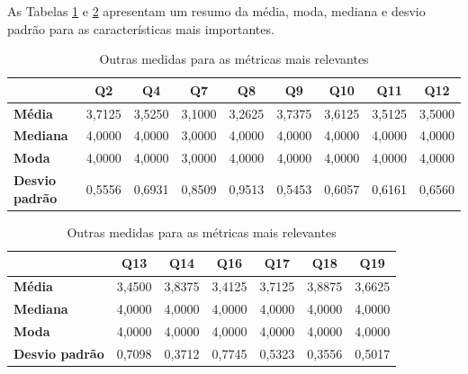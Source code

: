 As Tabelas \ref{outrasmedidas1} e \ref{outras medidas 2} apresentam um resumo da média, moda, mediana e desvio padrão para as características mais importantes.

\begin{table}[!htbp]
  \centering
  \caption{Outras medidas para as métricas mais relevantes}
    \begin{tabular}{llrrrrrrrr}
    \toprule
    \multicolumn{2}{l}{} & \multicolumn{1}{c}{\textbf{Q2}} & \multicolumn{1}{c}{\textbf{Q4}} & \multicolumn{1}{c}{\textbf{Q7}} & \multicolumn{1}{c}{\textbf{Q8}} & \multicolumn{1}{c}{\textbf{Q9}} & \multicolumn{1}{c}{\textbf{Q10}} & \multicolumn{1}{c}{\textbf{Q11}} & \multicolumn{1}{c}{\textbf{Q12}} \\
    \midrule
    \multicolumn{2}{l}{\textbf{Média}} & 3,7125 & 3,5250 & 3,1000 & 3,2625 & 3,7375 & 3,6125 & 3,5125 & 3,5000 \\
    \multicolumn{2}{l}{\textbf{Mediana}} & 4,0000 & 4,0000 & 3,0000 & 4,0000 & 4,0000 & 4,0000 & 4,0000 & 4,0000 \\
    \multicolumn{2}{l}{\textbf{Moda}} & 4,0000 & 4,0000 & 3,0000 & 4,0000 & 4,0000 & 4,0000 & 4,0000 & 4,0000 \\
    \multicolumn{2}{l}{\textbf{Desvio padrão}} & 0,5556 & 0,6931 & 0,8509 & 0,9513 & 0,5453 & 0,6057 & 0,6161 & 0,6560 \\
    \bottomrule
    \end{tabular}%
  \label{outrasmedidas1}%
\end{table}%

\begin{table}[!ht]
  \centering
  \caption{Outras medidas para as métricas mais relevantes}
    \begin{tabular}{llrrrrrr}
    \toprule
    \multicolumn{2}{l}{} & \multicolumn{1}{c}{\textbf{Q13}} & \multicolumn{1}{c}{\textbf{Q14}} & \multicolumn{1}{c}{\textbf{Q16}} & \multicolumn{1}{c}{\textbf{Q17}} & \multicolumn{1}{c}{\textbf{Q18}} & \multicolumn{1}{c}{\textbf{Q19}} \\
    \midrule
    \multicolumn{2}{l}{\textbf{Média}} & 3,4500 & 3,8375 & 3,4125 & 3,7125 & 3,8875 & 3,6625 \\
    \multicolumn{2}{l}{\textbf{Mediana}} & 4,0000 & 4,0000 & 4,0000 & 4,0000 & 4,0000 & 4,0000 \\
    \multicolumn{2}{l}{\textbf{Moda}} & 4,0000 & 4,0000 & 4,0000 & 4,0000 & 4,0000 & 4,0000 \\
    \multicolumn{2}{l}{\textbf{Desvio padrão}} & 0,7098 & 0,3712 & 0,7745 & 0,5323 & 0,3556 & 0,5017 \\
    \bottomrule
    \end{tabular}%
  \label{outras medidas 2}%
\end{table}%

